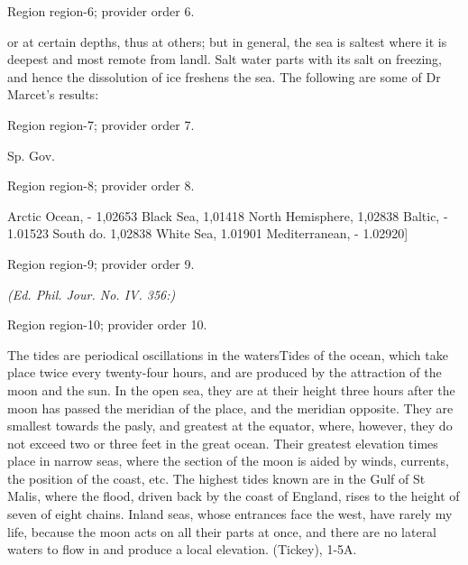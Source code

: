 \documentclass[11pt]{article}
\begin{document}
{\scriptsize\color{gray} Region region-6; provider order 6.\par}
\medskip

or at certain depths, thus at others; but in general, the sea is saltest where it is deepest and most remote from landl. Salt water parts with its salt on freezing, and hence the dissolution of ice freshens the sea. The following are some of Dr Marcet’s results:
\par

{\scriptsize\color{gray} Region region-7; provider order 7.\par}
\medskip

Sp. Gov.
\par

{\scriptsize\color{gray} Region region-8; provider order 8.\par}
\medskip

Arctic Ocean, - 1,02653 Black Sea, 1,01418 North Hemisphere, 1,02838 Baltic, - 1.01523 South do. 1,02838 White Sea, 1.01901 Mediterranean, - 1.02920]
\par

{\scriptsize\color{gray} Region region-9; provider order 9.\par}
\medskip

{\small\itshape (Ed. Phil. Jour. No. IV. 356:)\par}

{\scriptsize\color{gray} Region region-10; provider order 10.\par}
\medskip

The tides are periodical oscillations in the watersTides of the ocean, which take place twice every twenty-four hours, and are produced by the attraction of the moon and the sun. In the open sea, they are at their height three hours after the moon has passed the meridian of the place, and the meridian opposite. They are smallest towards the pasly, and greatest at the equator, where, however, they do not exceed two or three feet in the great ocean. Their greatest elevation times place in narrow seas, where the section of the moon is aided by winds, currents, the position of the coast, etc. The highest tides known are in the Gulf of St Malis, where the flood, driven back by the coast of England, rises to the height of seven of eight chains. Inland seas, whose entrances face the west, have rarely my life, because the moon acts on all their parts at once, and there are no lateral waters to flow in and produce a local elevation. (Tickey), 1-5A.
\par
\end{document}
